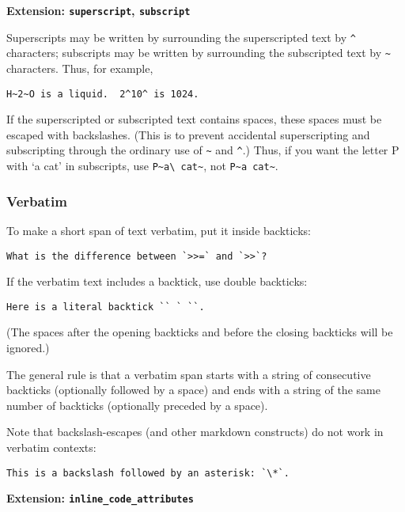 \documentclass[]{article}
\begin{document}
\textbf{Extension: \texttt{superscript}, \texttt{subscript}}

Superscripts may be written by surrounding the superscripted text by
\texttt{\^{}} characters; subscripts may be written by surrounding the
subscripted text by \texttt{\textasciitilde{}} characters. Thus, for
example,

\begin{verbatim}
H~2~O is a liquid.  2^10^ is 1024.
\end{verbatim}

If the superscripted or subscripted text contains spaces, these spaces
must be escaped with backslashes. (This is to prevent accidental
superscripting and subscripting through the ordinary use of
\texttt{\textasciitilde{}} and \texttt{\^{}}.) Thus, if you want the
letter P with `a cat' in subscripts, use
\texttt{P\textasciitilde{}a\textbackslash{} cat\textasciitilde{}}, not
\texttt{P\textasciitilde{}a cat\textasciitilde{}}.

\subsubsection{Verbatim}

To make a short span of text verbatim, put it inside backticks:

\begin{verbatim}
What is the difference between `>>=` and `>>`?
\end{verbatim}

If the verbatim text includes a backtick, use double backticks:

\begin{verbatim}
Here is a literal backtick `` ` ``.
\end{verbatim}

(The spaces after the opening backticks and before the closing backticks
will be ignored.)

The general rule is that a verbatim span starts with a string of
consecutive backticks (optionally followed by a space) and ends with a
string of the same number of backticks (optionally preceded by a space).

Note that backslash-escapes (and other markdown constructs) do not work
in verbatim contexts:

\begin{verbatim}
This is a backslash followed by an asterisk: `\*`.
\end{verbatim}

\textbf{Extension: \texttt{inline\_code\_attributes}}
\end{document}
